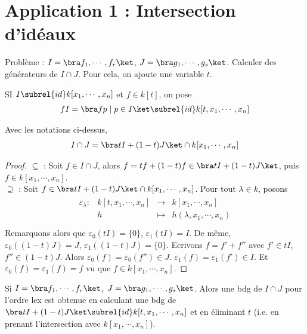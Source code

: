     \section{Application 1 : Intersection d'idéaux}
        Problème : $I = \bra f_1, \cdots, f_r \ket$, $J = \bra g_1, \cdots, g_s \ket$. Calculer des générateurs de $I \cap J$. Pour cela, on ajoute une variable $t$. 
        \begin{nota}
            SI $I \subrel{id} k[x_1, \cdots, x_n]$ et $f \in k[t]$, on pose
            \begin{align*}
                fI = \bra fp \mid p \in I \ket \subrel{id} k[t, x_1, \cdots, x_n]
            \end{align*}
        \end{nota}
        \begin{theo}
            Avec les notations ci-dessus,
            \begin{align*}
                I \cap J = \bra tI + (1 - t)J \ket \cap k[x_1, \cdots, x_n]
            \end{align*}
        \end{theo}
        \begin{proof}
            $\subseteq$ : Soit $f \in I \cap J$, alors $f = tf + (1 - t)f \in \bra tI + (1 - t)J \ket$, puis $f \in k[x_1, \cdots, x_n]$. \\
            $\supseteq$ : Soit $f \in \bra tI + (1-t)J \ket \cap k[x_1, \cdots, x_n]$. Pour tout $\lambda \in k$, posons
            \begin{align*}
                \begin{array}{cccc}
                    \varepsilon_\lambda : & k[t,x_1, \cdots, x_n] & \to & k[x_1, \cdots, x_n] \\
                    & h & \mapsto & h(\lambda, x_1, \cdots, x_n) \\
                \end{array}
            \end{align*}
            Remarquons alors que $\varepsilon_0(tI) = \{0\}$, $\varepsilon_1(tI) = I$. De même, $\varepsilon_0((1-t)J) = J$, $\varepsilon_1((1-t)J) = \{0\}$. Ecrivons $f = f' + f''$ avec $f' \in tI$, $f'' \in (1 - t)J$. Alors $\varepsilon_0(f) = \varepsilon_0(f'') \in J$. $\varepsilon_1(f) = \varepsilon_1(f') \in I$. Et $\varepsilon_0(f) = \varepsilon_1(f) = f$ vu que $f \in k[x_1, \cdots, x_n]$.
        \end{proof}
        \begin{coro}
            Si $I = \bra f_1, \cdots, f_r \ket$, $J = \bra g_1, \cdots, g_s \ket$. Alors une bdg de $I \cap J$ pour l'ordre lex est obtenue en calculant une bdg de $\bra tI + (1 - t)J \ket \subrel{id} k[t, x_1, \cdots, x_n]$ et en éliminant $t$ (i.e. en prenant l'intersection avec $k[x_1, \cdots, x_n]$).
        \end{coro}
        
